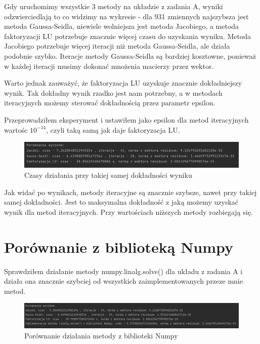 \documentclass[fleqn]{article}
\begin{document}
    \noindent Gdy uruchomimy wszystkie 3 metody na układzie z zadania A, 
    wyniki odzwierciedlają to co widzimy na wykresie - dla 931 zmiennych najszybsza jest metoda 
    Gaussa-Seidla, niewiele wolniejsza jest metoda Jacobiego, a metoda faktoryzacji LU potrzebuje 
    znacznie więcej czasu do uzyskania wyniku. Metoda Jacobiego potrzebuje więcej iteracji niż metoda
    Gaussa-Seidla, ale działa podobnie szybko. Iteracje metody Gaussa-Seidla są bardziej kosztowne,
    ponieważ w każdej iteracji musimy dokonać mnożenia macierzy przez wektor.

    \noindent Warto jednak zauważyć, że faktoryzacja LU uzyskuje znacznie dokładniejszy wynik.
    Tak dokładny wynik rzadko jest nam potrzebny, a w metodach iteracyjnych możemy 
    sterować dokładnością przez parametr epsilon.

    \noindent Przeprowadziłem eksperyment i ustawiłem jako epsilon dla metod iteracyjnych wartośc $10^{-14}$,
    czyli taką samą jak daje faktoryzacja LU.

    \begin{figure}[h]

        \centering
        \includegraphics[width=\textwidth]{tasamadok.png}
        \centering
        \caption{Czasy działania przy takiej samej dokładności wyniku}

    \end{figure}

    \noindent Jak widać po wynikach, metody iteracyjne są znacznie szybsze,
    nawet przy takiej samej dokładności. Jest to maksymalna dokładność z jaką możemy uzyskać
    wynik dla metod iteracyjnych. Przy wartościach niższych metody rozbiegają się.
    \newpage
    \section{Porównanie z biblioteką Numpy}
    Sprawdziłem działanie metody numpy.linalg.solve() dla układu z zadania A i działa ona znacznie szybciej od 
    wszystkich zaimplementowanych przeze mnie metod.

    \begin{figure}[h]

        \centering
        \includegraphics[width=\textwidth]{porownanieNP.png}
        \centering
        \caption{Porównanie działania metody z biblioteki Numpy}

    \end{figure}
\end{document}

